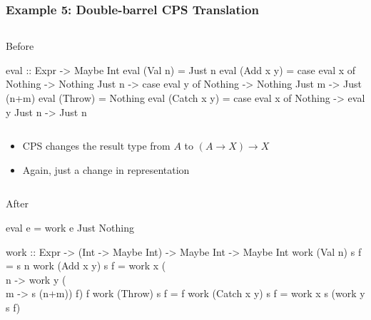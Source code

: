 \documentclass[smaller]{beamer}
\newcommand{\Conid}[1]{\mathit{#1}}
\begin{document}
\begin{frame}[fragile]
\frametitle{Example 5: Double-barrel CPS Translation}

\begin{columns}[t] 
\begin{column}{0.95\textwidth}
\begin{block}{Before}
{\scriptsize\begin{semiverbatim}
\alert{eval :: Expr -> Maybe Int}
eval (Val n)     =  Just n
eval (Add x y)   =  case eval x of Nothing -> Nothing
                                   Just n  -> case eval y of Nothing -> Nothing
                                                             Just m  -> Just (n+m)
eval (Throw)     =  Nothing
eval (Catch x y) =  case eval x of Nothing -> eval y
                                   Just n  -> Just n
\end{semiverbatim}}
\end{block}
\end{column}
\end{columns}
\vskip 0.1in
\begin{itemize}
\item CPS changes the result type from \ensuremath{\Conid{A}} to \ensuremath{(\Conid{A}\to \Conid{X})\to \Conid{X}}
\item Again, just a change in representation
\end{itemize}
\begin{columns}[t] 
\begin{column}{0.95\textwidth}
\begin{block}{After}

{\scriptsize\begin{semiverbatim}
eval e = work e Just Nothing

\alert{work :: Expr -> (Int -> Maybe Int) -> Maybe Int -> Maybe Int}
work (Val n)     s f  =  s n
work (Add x y)   s f  =  work x (\\n -> work y (\\m -> s (n+m)) f) f
work (Throw)     s f  =  f
work (Catch x y) s f  =  work x s (work y s f)
\end{semiverbatim}}
\end{block}
\end{column}
\end{columns}

\end{frame}
\end{document}
